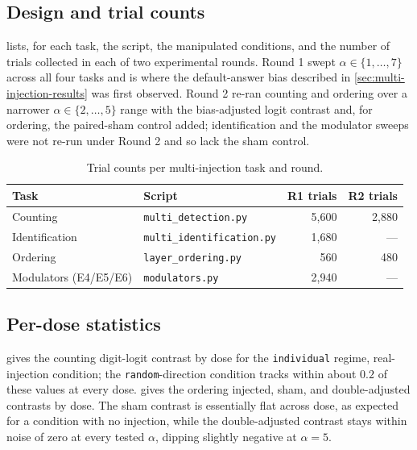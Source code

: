 \subsection{Design and trial counts}

 lists, for each task, the script, the manipulated conditions, and the number of trials collected in each of two experimental rounds.
Round 1 swept $\alpha\in\{1,\dots,7\}$ across all four tasks and is where the default-answer bias described in \cref{sec:multi-injection-results} was first observed.
Round 2 re-ran counting and ordering over a narrower $\alpha\in\{2,\dots,5\}$ range with the bias-adjusted logit contrast and, for ordering, the paired-sham control added; identification and the modulator sweeps were not re-run under Round 2 and so lack the sham control.

\begin{table}[H]
\centering
\small
\begin{tabular}{llrr}
\toprule
Task & Script & R1 trials & R2 trials \\
\midrule
Counting & \texttt{multi\_detection.py} & 5{,}600 & 2{,}880 \\
Identification & \texttt{multi\_identification.py} & 1{,}680 & --- \\
Ordering & \texttt{layer\_ordering.py} & 560 & 480 \\
Modulators (E4/E5/E6) & \texttt{modulators.py} & 2{,}940 & --- \\
\bottomrule
\end{tabular}
\caption{Trial counts per multi-injection task and round.}
\label{tab:multi-injection-trials}
\end{table}

\subsection{Per-dose statistics}

 gives the counting digit-logit contrast by dose for the \texttt{individual} regime, real-injection condition; the \texttt{random}-direction condition tracks within about $0.2$ of these values at every dose.
 gives the ordering injected, sham, and double-adjusted contrasts by dose.
The sham contrast is essentially flat across dose, as expected for a condition with no injection, while the double-adjusted contrast stays within noise of zero at every tested $\alpha$, dipping slightly negative at $\alpha{=}5$.

